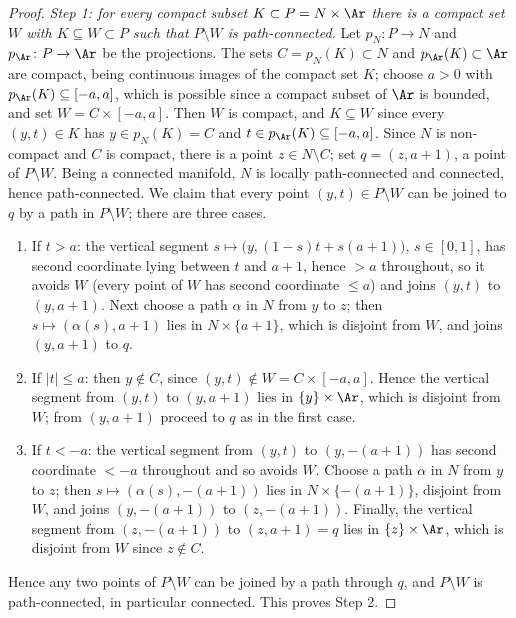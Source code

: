 \begin{proof}
\textit{Step 1: for every compact subset $K\subset P=N\times\Ar$ there is
a compact set $W$ with $K\subseteq W\subset P$ such that $P\setminus W$ is
path-connected.} Let $p_N\colon P\to N$ and $p_{\Ar}\colon P\to\Ar$ be the
projections. The sets $C=p_N(K)\subset N$ and $p_{\Ar}(K)\subset\Ar$ are
compact, being continuous images of the compact set $K$; choose $a>0$ with
$p_{\Ar}(K)\subseteq[-a,a]$, which is possible since a compact subset of
$\Ar$ is bounded, and set $W=C\times[-a,a]$. Then $W$ is compact, and
$K\subseteq W$ since every $(y,t)\in K$ has $y\in p_N(K)=C$ and
$t\in p_{\Ar}(K)\subseteq[-a,a]$. Since $N$ is non-compact and $C$ is
compact, there is a point $z\in N\setminus C$; set $q=(z,a+1)$, a point of
$P\setminus W$. Being a connected manifold, $N$ is locally path-connected
and connected, hence path-connected. We claim that every point
$(y,t)\in P\setminus W$ can be joined to $q$ by a path in $P\setminus W$;
there are three cases.
\begin{enumerate}
\item If $t>a$: the vertical segment $s\mapsto\bigl(y,(1-s)t+s(a+1)\bigr)$,
$s\in[0,1]$, has second coordinate lying between $t$ and $a+1$, hence
$>a$ throughout, so it avoids $W$ (every point of $W$ has second
coordinate $\le a$) and joins $(y,t)$ to $(y,a+1)$. Next choose a path
$\alpha$ in $N$ from $y$ to $z$; then $s\mapsto(\alpha(s),a+1)$ lies in
$N\times\{a+1\}$, which is disjoint from $W$, and joins $(y,a+1)$ to $q$.
\item If $|t|\le a$: then $y\notin C$, since $(y,t)\notin W=C\times[-a,a]$.
Hence the vertical segment from $(y,t)$ to $(y,a+1)$ lies in
$\{y\}\times\Ar$, which is disjoint from $W$; from $(y,a+1)$ proceed to
$q$ as in the first case.
\item If $t<-a$: the vertical segment from $(y,t)$ to $(y,-(a+1))$ has
second coordinate $<-a$ throughout and so avoids $W$. Choose a path
$\alpha$ in $N$ from $y$ to $z$; then $s\mapsto(\alpha(s),-(a+1))$ lies in
$N\times\{-(a+1)\}$, disjoint from $W$, and joins $(y,-(a+1))$ to
$(z,-(a+1))$. Finally, the vertical segment from $(z,-(a+1))$ to
$(z,a+1)=q$ lies in $\{z\}\times\Ar$, which is disjoint from $W$ since
$z\notin C$.
\end{enumerate}
Hence any two points of $P\setminus W$ can be joined by a path through
$q$, and $P\setminus W$ is path-connected, in particular connected. This
proves Step 2.


\end{proof}
